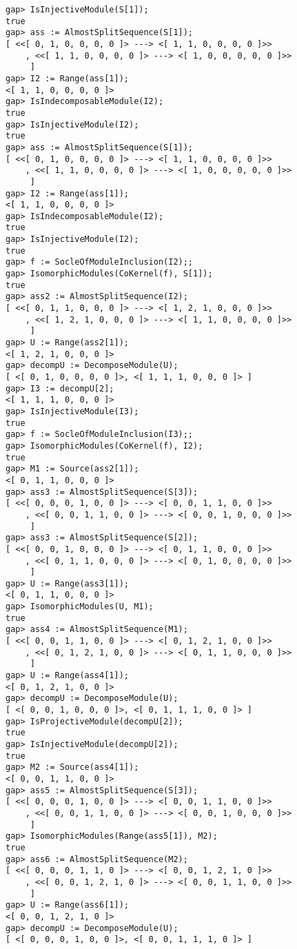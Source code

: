 \documentclass{amsart}
\theoremstyle{definition}
\theoremstyle{theoretic}
\begin{document}
\begin{verbatim}
gap> IsInjectiveModule(S[1]);
true
gap> ass := AlmostSplitSequence(S[1]);
[ <<[ 0, 1, 0, 0, 0, 0 ]> ---> <[ 1, 1, 0, 0, 0, 0 ]>>
    , <<[ 1, 1, 0, 0, 0, 0 ]> ---> <[ 1, 0, 0, 0, 0, 0 ]>>
     ]
gap> I2 := Range(ass[1]);
<[ 1, 1, 0, 0, 0, 0 ]>
gap> IsIndecomposableModule(I2);
true
gap> IsInjectiveModule(I2);
true
gap> ass := AlmostSplitSequence(S[1]);
[ <<[ 0, 1, 0, 0, 0, 0 ]> ---> <[ 1, 1, 0, 0, 0, 0 ]>>
    , <<[ 1, 1, 0, 0, 0, 0 ]> ---> <[ 1, 0, 0, 0, 0, 0 ]>>
     ]
gap> I2 := Range(ass[1]);
<[ 1, 1, 0, 0, 0, 0 ]>
gap> IsIndecomposableModule(I2);
true
gap> IsInjectiveModule(I2);
true
gap> f := SocleOfModuleInclusion(I2);;
gap> IsomorphicModules(CoKernel(f), S[1]);
true
gap> ass2 := AlmostSplitSequence(I2);  
[ <<[ 0, 1, 1, 0, 0, 0 ]> ---> <[ 1, 2, 1, 0, 0, 0 ]>>
    , <<[ 1, 2, 1, 0, 0, 0 ]> ---> <[ 1, 1, 0, 0, 0, 0 ]>>
     ]
gap> U := Range(ass2[1]);
<[ 1, 2, 1, 0, 0, 0 ]>
gap> decompU := DecomposeModule(U);
[ <[ 0, 1, 0, 0, 0, 0 ]>, <[ 1, 1, 1, 0, 0, 0 ]> ]
gap> I3 := decompU[2];
<[ 1, 1, 1, 0, 0, 0 ]>
gap> IsInjectiveModule(I3);
true
gap> f := SocleOfModuleInclusion(I3);;    
gap> IsomorphicModules(CoKernel(f), I2); 
true
gap> M1 := Source(ass2[1]);
<[ 0, 1, 1, 0, 0, 0 ]>
gap> ass3 := AlmostSplitSequence(S[3]);
[ <<[ 0, 0, 0, 1, 0, 0 ]> ---> <[ 0, 0, 1, 1, 0, 0 ]>>
    , <<[ 0, 0, 1, 1, 0, 0 ]> ---> <[ 0, 0, 1, 0, 0, 0 ]>>
     ]
gap> ass3 := AlmostSplitSequence(S[2]);
[ <<[ 0, 0, 1, 0, 0, 0 ]> ---> <[ 0, 1, 1, 0, 0, 0 ]>>
    , <<[ 0, 1, 1, 0, 0, 0 ]> ---> <[ 0, 1, 0, 0, 0, 0 ]>>
     ]
gap> U := Range(ass3[1]);
<[ 0, 1, 1, 0, 0, 0 ]>
gap> IsomorphicModules(U, M1);
true
gap> ass4 := AlmostSplitSequence(M1);  
[ <<[ 0, 0, 1, 1, 0, 0 ]> ---> <[ 0, 1, 2, 1, 0, 0 ]>>
    , <<[ 0, 1, 2, 1, 0, 0 ]> ---> <[ 0, 1, 1, 0, 0, 0 ]>>
     ]
gap> U := Range(ass4[1]);
<[ 0, 1, 2, 1, 0, 0 ]>
gap> decompU := DecomposeModule(U);
[ <[ 0, 0, 1, 0, 0, 0 ]>, <[ 0, 1, 1, 1, 0, 0 ]> ]
gap> IsProjectiveModule(decompU[2]);
true
gap> IsInjectiveModule(decompU[2]);
true
gap> M2 := Source(ass4[1]);
<[ 0, 0, 1, 1, 0, 0 ]>
gap> ass5 := AlmostSplitSequence(S[3]);
[ <<[ 0, 0, 0, 1, 0, 0 ]> ---> <[ 0, 0, 1, 1, 0, 0 ]>>
    , <<[ 0, 0, 1, 1, 0, 0 ]> ---> <[ 0, 0, 1, 0, 0, 0 ]>>
     ]
gap> IsomorphicModules(Range(ass5[1]), M2);
true
gap> ass6 := AlmostSplitSequence(M2);      
[ <<[ 0, 0, 0, 1, 1, 0 ]> ---> <[ 0, 0, 1, 2, 1, 0 ]>>
    , <<[ 0, 0, 1, 2, 1, 0 ]> ---> <[ 0, 0, 1, 1, 0, 0 ]>>
     ]
gap> U := Range(ass6[1]);
<[ 0, 0, 1, 2, 1, 0 ]>
gap> decompU := DecomposeModule(U);        
[ <[ 0, 0, 0, 1, 0, 0 ]>, <[ 0, 0, 1, 1, 1, 0 ]> ]

\end{verbatim}
\end{document}
